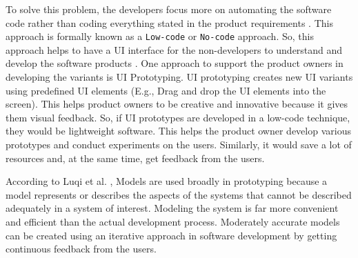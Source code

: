 To solve this problem, the developers focus more on automating the software code rather than coding everything stated in the product requirements \cite{article:prototyping:hoffnagle}.
This approach is formally known as a \texttt{Low-code} or \texttt{No-code} approach.
So, this approach helps to have a UI interface for the non-developers to understand and develop the software products \cite{paper:lowcode:khorram}.
One approach to support the product owners in developing the variants is UI Prototyping. 
UI prototyping creates new UI variants using predefined UI elements (E.g., Drag and drop the UI elements into the screen). 
This helps product owners to be creative and innovative because it gives them visual feedback.
So, if UI prototypes are developed in a low-code technique, they would be lightweight software.
This helps the product owner develop various prototypes and conduct experiments on the users.
Similarly, it would save a lot of resources and, at the same time, get feedback from the users.

According to Luqi et al. \cite{paper:prototyping:luqi}, Models are used broadly in prototyping because a model represents or describes the aspects of the systems that cannot be described adequately in a system of interest.
Modeling the system is far more convenient and efficient than the actual development process. 
Moderately accurate models can be created using an iterative approach in software development by getting continuous feedback from the users.

